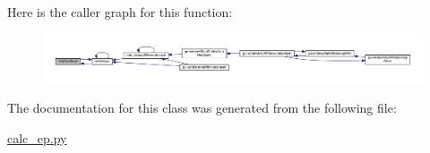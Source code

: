 Here is the caller graph for this function\+:
\nopagebreak
\begin{figure}[H]
\begin{center}
\leavevmode
\includegraphics[width=350pt]{classcalc__ep_1_1MainWindow_adf2bcf83729f963606d64edf1f739c03_icgraph}
\end{center}
\end{figure}




The documentation for this class was generated from the following file\+:\begin{DoxyCompactItemize}
\item 
\hyperlink{calc__ep_8py}{calc\+\_\+ep.\+py}\end{DoxyCompactItemize}
